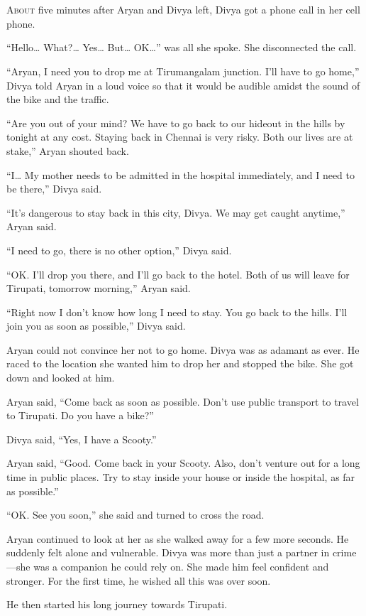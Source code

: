 \chapter{}

\lettrine{A}{bout} five minutes after Aryan and Divya left, Divya got a phone call in her
cell phone.

“Hello… What?… Yes… But… OK…” was all she spoke. She
disconnected the call.

“Aryan, I need you to drop me at Tirumangalam junction. I'll have to go home,”
Divya told Aryan in a loud voice so that it would be audible amidst the sound of
the bike and the traffic.

“Are you out of your mind? We have to go back to our hideout in the hills by
tonight at any cost. Staying back in Chennai is very risky. Both our lives are
at stake,” Aryan shouted back.

“I… My mother needs to be admitted in the hospital immediately, and I need
to be there,” Divya said.

“It's dangerous to stay back in this city, Divya. We may get caught anytime,”
Aryan said.

“I need to go, there is no other option,” Divya said.

“OK. I'll drop you there, and I'll go back to the hotel. Both of us will leave for
Tirupati, tomorrow morning,” Aryan said.

“Right now I don't know how long I need to stay. You go back to the hills. I'll
join you as soon as possible,” Divya said.

Aryan could not convince her not to go home. Divya was as adamant as ever. He
raced to the location she wanted him to drop her and stopped the bike. She got
down and looked at him.

Aryan said, “Come back as soon as possible. Don't use public transport to travel
to Tirupati. Do you have a bike?”

Divya said, “Yes, I have a Scooty.”

Aryan said, “Good. Come back in your Scooty. Also, don't venture out for a long
time in public places. Try to stay inside your house or inside the hospital, as
far as possible.”

“OK. See you soon,” she said and turned to cross the road.

Aryan continued to look at her as she walked away for a few more seconds. He
suddenly felt alone and vulnerable. Divya was more than just a partner in
crime—she was a companion he could rely on. She made him feel confident and
stronger. For the first time, he wished all this was over soon.

He then started his long journey towards Tirupati.